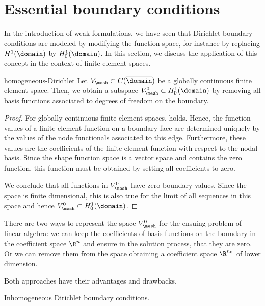 \section{Essential boundary conditions}

\begin{intro}
  In the introduction of weak formulations, we have seen that
  Dirichlet boundary conditions are modeled by modifying the function
  space, for instance by replacing $H^1(\domain)$ by
  $H^1_0(\domain)$. In this section, we discuss the application of
  this concept in the context of finite element spaces.
\end{intro}

\begin{Lemma}{homogeneous-Dirichlet}
  Let $V_{\mesh} \subset C(\overline\domain)$ be a globally continuous
  finite element space. Then, we obtain a subspace
  $V_{\mesh}^0 \subset H^1_0(\domain)$ by removing all basis functions
  associated to degrees of freedom on the boundary.
\end{Lemma}

\begin{proof}
  For globally continuous finite element spaces,
   holds. Hence, the function values
  of a finite element function on a boundary face are determined
  uniquely by the values of the node functionals associated to this
  edge. Furthermore, these values are the coefficients of the finite
  element function with respect to the nodal basis. Since the shape
  function space is a vector space and contains the zero function,
  this function must be obtained by setting all coefficients to zero.

  We conclude that all functions in $V_{\mesh}^0$ have zero boundary
  values. Since the space is finite dimensional, this is also true for
  the limit of all sequences in this space and hence
  $V_{\mesh}^0 \subset H^1_0(\domain)$.
\end{proof}

\begin{remark}
  There are two ways to represent the space $V_{\mesh}^0$ for the
  ensuing problem of linear algebra: we can keep the coefficients of
  basis functions on the boundary in the coefficient space $\R^n$ and
  ensure in the solution process, that they are zero. Or we can remove
  them from the space obtaining a coefficient space $\R^{n_0}$ of
  lower dimension.

  Both approaches have their advantages and drawbacks.
\end{remark}

\begin{remark}
  Inhomogeneous Dirichlet boundary conditions.
\end{remark}

